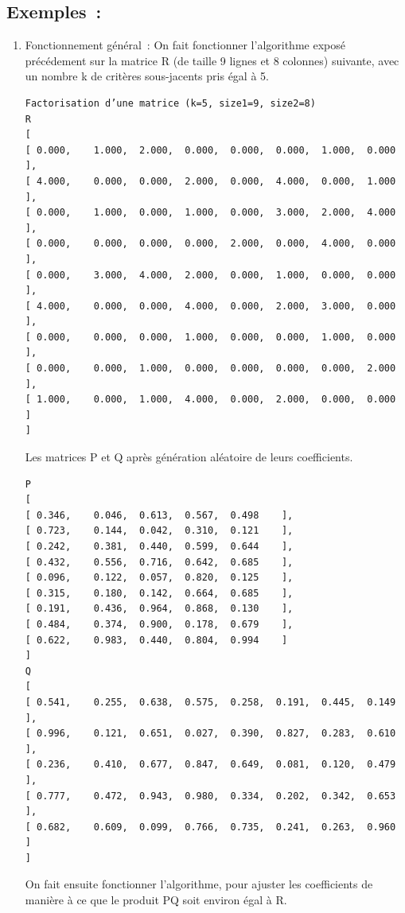 \documentclass{article}
\begin{document}
\subsection{Exemples :}
\label{sec:org42b0a50}
\begin{enumerate}
\item Fonctionnement général :
\label{sec:org0106ff2}
On fait fonctionner l’algorithme exposé précédement sur la matrice R (de taille
9 lignes et 8 colonnes) suivante, avec un nombre k de critères sous-jacents pris
égal à 5.

\begin{verbatim}
Factorisation d’une matrice (k=5, size1=9, size2=8)
R
[
[ 0.000, 	1.000, 	2.000, 	0.000, 	0.000, 	0.000, 	1.000, 	0.000	 ],
[ 4.000, 	0.000, 	0.000, 	2.000, 	0.000, 	4.000, 	0.000, 	1.000	 ],
[ 0.000, 	1.000, 	0.000, 	1.000, 	0.000, 	3.000, 	2.000, 	4.000	 ],
[ 0.000, 	0.000, 	0.000, 	0.000, 	2.000, 	0.000, 	4.000, 	0.000	 ],
[ 0.000, 	3.000, 	4.000, 	2.000, 	0.000, 	1.000, 	0.000, 	0.000	 ],
[ 4.000, 	0.000, 	0.000, 	4.000, 	0.000, 	2.000, 	3.000, 	0.000	 ],
[ 0.000, 	0.000, 	0.000, 	1.000, 	0.000, 	0.000, 	1.000, 	0.000	 ],
[ 0.000, 	0.000, 	1.000, 	0.000, 	0.000, 	0.000, 	0.000, 	2.000	 ],
[ 1.000, 	0.000, 	1.000, 	4.000, 	0.000, 	2.000, 	0.000, 	0.000	 ]
]
\end{verbatim}
Les matrices P et Q après génération aléatoire de leurs coefficients.
\begin{verbatim}
P
[
[ 0.346, 	0.046, 	0.613, 	0.567, 	0.498	 ],
[ 0.723, 	0.144, 	0.042, 	0.310, 	0.121	 ],
[ 0.242, 	0.381, 	0.440, 	0.599, 	0.644	 ],
[ 0.432, 	0.556, 	0.716, 	0.642, 	0.685	 ],
[ 0.096, 	0.122, 	0.057, 	0.820, 	0.125	 ],
[ 0.315, 	0.180, 	0.142, 	0.664, 	0.685	 ],
[ 0.191, 	0.436, 	0.964, 	0.868, 	0.130	 ],
[ 0.484, 	0.374, 	0.900, 	0.178, 	0.679	 ],
[ 0.622, 	0.983, 	0.440, 	0.804, 	0.994	 ]
]
Q
[
[ 0.541, 	0.255, 	0.638, 	0.575, 	0.258, 	0.191, 	0.445, 	0.149	 ],
[ 0.996, 	0.121, 	0.651, 	0.027, 	0.390, 	0.827, 	0.283, 	0.610	 ],
[ 0.236, 	0.410, 	0.677, 	0.847, 	0.649, 	0.081, 	0.120, 	0.479	 ],
[ 0.777, 	0.472, 	0.943, 	0.980, 	0.334, 	0.202, 	0.342, 	0.653	 ],
[ 0.682, 	0.609, 	0.099, 	0.766, 	0.735, 	0.241, 	0.263, 	0.960	 ]
]
\end{verbatim}

On fait ensuite fonctionner l’algorithme, pour ajuster les coefficients de
manière à ce que le produit PQ soit environ égal à R.


\end{enumerate}
\end{document}
